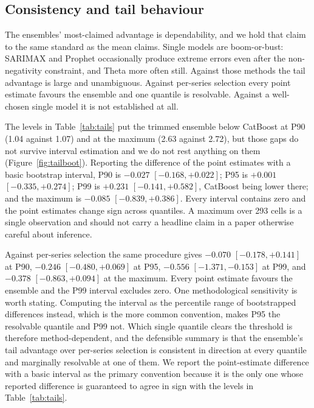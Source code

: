 \documentclass[11pt]{article}
\begin{document}
\subsection{Consistency and tail behaviour}
\label{sec:tails}

The ensembles' most-claimed advantage is dependability, and we hold that claim to the same standard as the mean claims. Single models are boom-or-bust: SARIMAX and Prophet occasionally produce extreme errors even after the non-negativity constraint, and Theta more often still. Against those methods the tail advantage is large and unambiguous. Against per-series selection every point estimate favours the ensemble and one quantile is resolvable. Against a well-chosen single model it is not established at all.

The levels in Table~\ref{tab:tails} put the trimmed ensemble below CatBoost at P90 (1.04 against 1.07) and at the maximum (2.63 against 2.72), but those gaps do not survive interval estimation and we do not rest anything on them (Figure~\ref{fig:tailboot}). Reporting the difference of the point estimates with a basic bootstrap interval, P90 is $-0.027$ $[-0.168, +0.022]$; P95 is $+0.001$ $[-0.335, +0.274]$; P99 is $+0.231$ $[-0.141, +0.582]$, CatBoost being lower there; and the maximum is $-0.085$ $[-0.839, +0.386]$. Every interval contains zero and the point estimates change sign across quantiles. A maximum over 293 cells is a single observation and should not carry a headline claim in a paper otherwise careful about inference.

Against per-series selection the same procedure gives $-0.070$ $[-0.178, +0.141]$ at P90, $-0.246$ $[-0.480, +0.069]$ at P95, $-0.556$ $[-1.371, -0.153]$ at P99, and $-0.378$ $[-0.863, +0.094]$ at the maximum. Every point estimate favours the ensemble and the P99 interval excludes zero. One methodological sensitivity is worth stating. Computing the interval as the percentile range of bootstrapped differences instead, which is the more common convention, makes P95 the resolvable quantile and P99 not. Which single quantile clears the threshold is therefore method-dependent, and the defensible summary is that the ensemble's tail advantage over per-series selection is consistent in direction at every quantile and marginally resolvable at one of them. We report the point-estimate difference with a basic interval as the primary convention because it is the only one whose reported difference is guaranteed to agree in sign with the levels in Table~\ref{tab:tails}.
\end{document}
